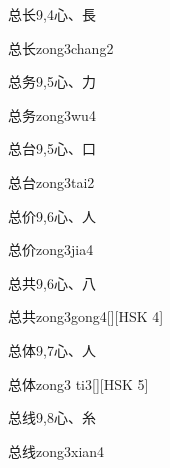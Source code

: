 \begin{entry}{总长}{9,4}{⼼、⾧}
  \begin{phonetics}{总长}{zong3chang2}
  \end{phonetics}
\end{entry}

\begin{entry}{总务}{9,5}{⼼、⼒}
  \begin{phonetics}{总务}{zong3wu4}
  \end{phonetics}
\end{entry}

\begin{entry}{总台}{9,5}{⼼、⼝}
  \begin{phonetics}{总台}{zong3tai2}
  \end{phonetics}
\end{entry}

\begin{entry}{总价}{9,6}{⼼、⼈}
  \begin{phonetics}{总价}{zong3jia4}
  \end{phonetics}
\end{entry}

\begin{entry}{总共}{9,6}{⼼、⼋}
  \begin{phonetics}{总共}{zong3gong4}[][HSK 4]
  \end{phonetics}
\end{entry}

\begin{entry}{总体}{9,7}{⼼、⼈}
  \begin{phonetics}{总体}{zong3 ti3}[][HSK 5]
  \end{phonetics}
\end{entry}

\begin{entry}{总线}{9,8}{⼼、⽷}
  \begin{phonetics}{总线}{zong3xian4}
  \end{phonetics}
\end{entry}


